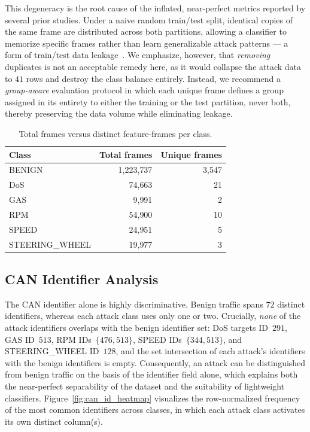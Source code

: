 \documentclass[conference]{IEEEtran}
\begin{document}
This degeneracy is the root cause of the inflated, near-perfect metrics reported
by several prior studies. Under a naive random train/test split, identical
copies of the same frame are distributed across both partitions, allowing a
classifier to memorize specific frames rather than learn generalizable attack
patterns --- a form of train/test data leakage~\cite{article_emre,fi18010042}.
We emphasize, however, that \emph{removing} duplicates is not an acceptable
remedy here, as it would collapse the attack data to $41$ rows and destroy the
class balance entirely. Instead, we recommend a \emph{group-aware} evaluation
protocol in which each unique frame defines a group assigned in its entirety to
either the training or the test partition, never both, thereby preserving the
data volume while eliminating leakage.

\begin{table}[htbp]
\centering
\caption{Total frames versus distinct feature-frames per class.}
\label{tab:unique_frames}
\begin{tabular}{lrr}
\hline
Class & Total frames & Unique frames \\
\hline
BENIGN          & 1{,}223{,}737 & 3{,}547 \\
DoS             & 74{,}663      & 21 \\
GAS             & 9{,}991       & 2 \\
RPM             & 54{,}900      & 10 \\
SPEED           & 24{,}951      & 5 \\
STEERING\_WHEEL & 19{,}977      & 3 \\
\hline
\end{tabular}
\end{table}

\subsection{CAN Identifier Analysis}

The CAN identifier alone is highly discriminative. Benign traffic spans $72$
distinct identifiers, whereas each attack class uses only one or two. Crucially,
\emph{none} of the attack identifiers overlaps with the benign identifier set:
DoS targets ID~$291$, GAS ID~$513$, RPM IDs~$\{476,513\}$, SPEED IDs~$\{344,
513\}$, and STEERING\_WHEEL ID~$128$, and the set intersection of each attack's
identifiers with the benign identifiers is empty. Consequently, an attack can be
distinguished from benign traffic on the basis of the identifier field alone,
which explains both the near-perfect separability of the dataset and the
suitability of lightweight classifiers. Figure~\ref{fig:can_id_heatmap}
visualizes the row-normalized frequency of the most common identifiers across
classes, in which each attack class activates its own distinct column(s).
\end{document}
